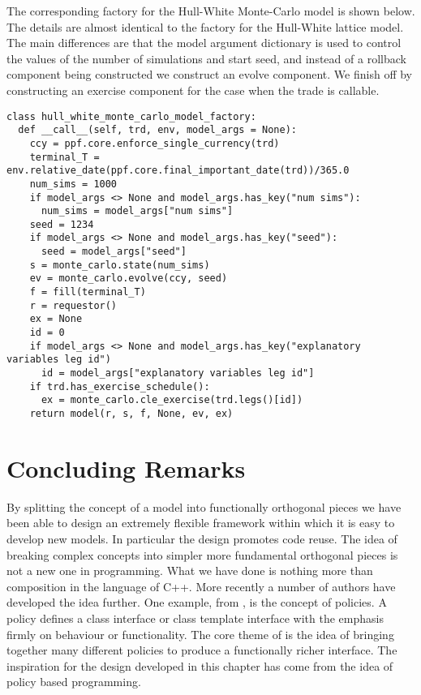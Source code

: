 The corresponding factory for the Hull-White Monte-Carlo model is
shown below. The details are almost identical to the factory for the
Hull-White lattice model. The main differences are that the model
argument dictionary is used to control the values of the number of
simulations and start seed, and instead of a rollback component being
constructed we construct an evolve component. We finish off by
constructing an exercise component for the case when the trade is
callable.
\begin{verbatim}
class hull_white_monte_carlo_model_factory:
  def __call__(self, trd, env, model_args = None):
    ccy = ppf.core.enforce_single_currency(trd)
    terminal_T = env.relative_date(ppf.core.final_important_date(trd))/365.0
    num_sims = 1000
    if model_args <> None and model_args.has_key("num sims"):
      num_sims = model_args["num sims"]
    seed = 1234
    if model_args <> None and model_args.has_key("seed"):
      seed = model_args["seed"]
    s = monte_carlo.state(num_sims)
    ev = monte_carlo.evolve(ccy, seed)
    f = fill(terminal_T)
    r = requestor()
    ex = None
    id = 0
    if model_args <> None and model_args.has_key("explanatory variables leg id")
      id = model_args["explanatory variables leg id"]
    if trd.has_exercise_schedule():
      ex = monte_carlo.cle_exercise(trd.legs()[id])
    return model(r, s, f, None, ev, ex)
\end{verbatim}

\section{Concluding Remarks}
By splitting the concept of a model into functionally orthogonal
pieces we have been able to design an extremely flexible framework
within which it is easy to develop new models. In particular the
design promotes code reuse. The idea of breaking complex concepts into
simpler more fundamental orthogonal pieces is not a new one in
programming. What we have done is nothing more than composition in the
language of C++. More recently a number of authors have developed the
idea further. One example, from \cite{book:ALEXANDRESCU}, is the
concept of policies. A policy defines a class interface or class
template interface with the emphasis firmly on behaviour or
functionality. The core theme of \cite{book:ALEXANDRESCU} is the idea
of bringing together many different policies to produce a functionally
richer interface. The inspiration for the design developed in this
chapter has come from the idea of policy based programming.

